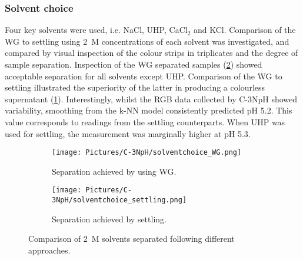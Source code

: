 \subsubsection{Solvent choice}
Four key solvents were used, i.e. NaCl, \gls{UHP}, CaCl$_2$ and KCl. Comparison of the WG to settling using \SI{2}{M} concentrations of each solvent was investigated, and compared by visual inspection of the colour strips in triplicates and the degree of sample separation. Inspection of the WG separated samples (\cref{subfig:solvent_settling}) showed acceptable separation for all solvents except \gls{UHP}. Comparison of the WG to settling illustrated the superiority of the latter in producing a colourless supernatant (\cref{subfig:solvent_WG}). Interestingly, whilst the RGB data collected by C-3NpH showed variability, smoothing from the k-NN model consistently predicted pH {5.2}. This value corresponds to readings from the settling counterparts. When \gls{UHP} was used for settling, the measurement was marginally higher at %
pH {5.3}.



\begin{figure}[h!]
	\centering
	\begin{subfigure}[b]{\linewidth} 
		\centering
		\texttt{[image: Pictures/C-3NpH/solventchoice\_WG.png]}
		\caption{Separation achieved by using WG.}
		\label{subfig:solvent_WG}
	\end{subfigure}
	\begin{subfigure}[b]{\linewidth}
	\centering
		\texttt{[image: Pictures/C-3NpH/solventchoice\_settling.png]}
		\caption{Separation achieved by settling.}
		\label{subfig:solvent_settling}
	\end{subfigure}
	\captionsetup{justification = centering}
	\caption{Comparison of \SI{2}{M} solvents separated following different approaches.}
	\label{fig:solventchoice}
\end{figure}   	

